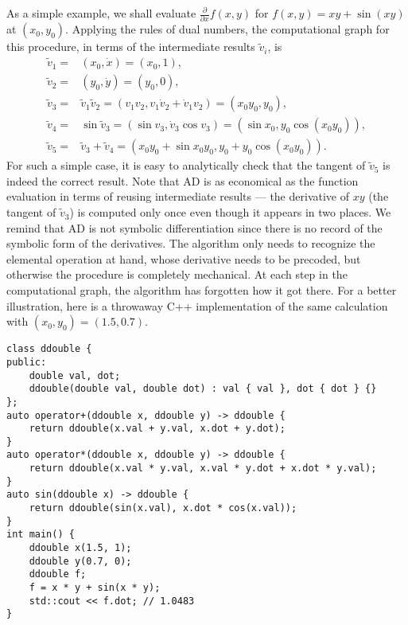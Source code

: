\documentclass{article}
\begin{document}
As a simple example, we shall evaluate $\frac{\partial}{\partial x} f(x, y)$ for $f(x, y) = x y + \sin (xy)$ at $(x_0,y_0)$. Applying the rules of dual numbers, the computational graph for this procedure, in terms of the intermediate results $\tilde v_i$, is
\begin{equation}
  \label{eq:forward_example}
  \begin{split}
    \tilde v_1 =& (x_0,\dot x) = (x_0,1), \\
    \tilde v_2 =& (y_0,\dot y) = (y_0,0), \\
    \tilde v_3 =& \tilde v_1\tilde v_2 = (v_1v_2, v_1 \dot v_2 +
    \dot v_1 v_2) = (x_0y_0, y_0), \\
    \tilde v_4 =& \sin \tilde v_3 = (\sin v_3, \dot v_3 \cos v_3) =
    (\sin x_0, y_0 \cos (x_0y_0)), \\
    \tilde v_5 =& \tilde v_3 + \tilde v_4 = (x_0y_0 + \sin x_0y_0, y_0
    + y_0 \cos (x_0y_0)).
  \end{split}
\end{equation}
For such a simple case, it is easy to analytically check that the tangent of $\tilde v_5$ is indeed the correct result. Note that AD is as economical as the function evaluation in terms of reusing intermediate results --- the derivative of $xy$ (the tangent of $\tilde v_3$) is computed only once even though it appears in two places. We remind that AD is not symbolic differentiation since there is no record of the symbolic form of the derivatives. The algorithm only needs to recognize the elemental operation at hand, whose derivative needs to be precoded, but otherwise the procedure is completely mechanical. At each step in the computational graph, the algorithm has forgotten how it got there. For a better illustration, here is a throwaway C++ implementation of the same calculation with $(x_0,y_0) = (1.5,0.7)$.
\begin{verbatim}
class ddouble {
public:
    double val, dot;
    ddouble(double val, double dot) : val { val }, dot { dot } {}
};
auto operator+(ddouble x, ddouble y) -> ddouble {
    return ddouble(x.val + y.val, x.dot + y.dot);
}
auto operator*(ddouble x, ddouble y) -> ddouble {
    return ddouble(x.val * y.val, x.val * y.dot + x.dot * y.val);
}
auto sin(ddouble x) -> ddouble {
    return ddouble(sin(x.val), x.dot * cos(x.val));
}
int main() {
    ddouble x(1.5, 1);
    ddouble y(0.7, 0);
    ddouble f;
    f = x * y + sin(x * y);
    std::cout << f.dot; // 1.0483
}
\end{verbatim}
\end{document}

